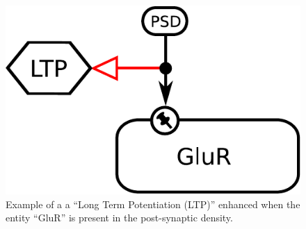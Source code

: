 \begin{figure}[H]
  \centering
  \includegraphics[scale = 0.5]{examples/ex-stimulation}
  \caption{Example of a  a  ``Long Term Potentiation (LTP)'' enhanced when the entity ``GluR'' is present in the post-synaptic density.}
  \label{fig:ex-stimulation}
\end{figure}

\normalcolor



